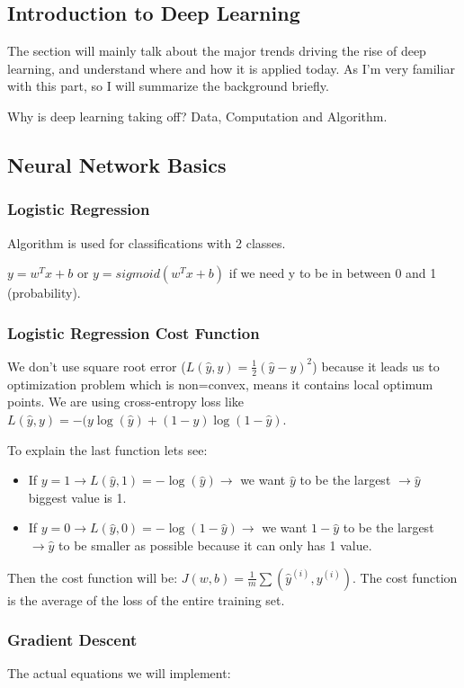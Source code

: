 \subsection{Introduction to Deep Learning}
The section will mainly talk about the major trends driving the rise of deep learning, and understand where and how it is applied today. As I'm very familiar with this part, so I will summarize the background briefly.

Why is deep learning taking off? Data, Computation and Algorithm.

\subsection{Neural Network Basics}
\subsubsection{Logistic Regression}
Algorithm is used for classifications with 2 classes.

$y = w^T x + b$ or $y = sigmoid (w^T x + b)$ if we need y to be in between 0 and 1 (probability).

\subsubsection{Logistic Regression Cost Function}
We don't use square root error ($L(\hat{y}, y) = \frac{1}{2} (\hat{y}- y)^2$) because it leads us to optimization problem which is non=convex, means it contains local optimum points. We are using cross-entropy loss like $L(\hat{y}, y) = - (y\log(\hat{y}) + (1-y)\log(1-\hat{y})$.

To explain the last function lets see:
\begin{itemize}
    \item If $y = 1 \to L(\hat{y},1) = -\log(\hat{y}) \to$ we want $\hat{y}$ to be the largest $\to \hat{y}$ biggest value is 1.
    \item If $y = 0 \to L(\hat{y},0) = -\log(1-\hat{y}) \to$ we want $1-\hat{y}$ to be the largest $\to \hat{y}$ to be smaller as possible because it can only has 1 value.
\end{itemize}

Then the cost function will be: $J(w, b) = \frac{1}{m} \sum(\hat{y}^{(i)}, y^{(i)})$. The cost function is the average of the loss of the entire training set.

\subsubsection{Gradient Descent}
The actual equations we will implement:

